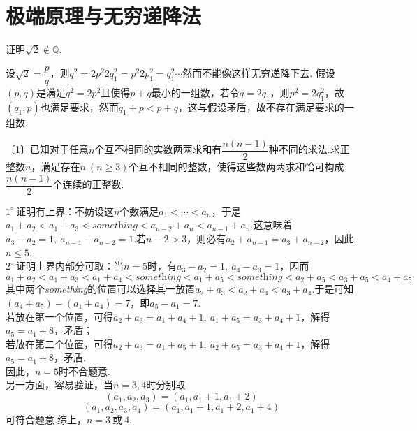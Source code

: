 \documentclass[cn,hazy,black,10pt,normal]{elegantnote}
\newenvironment{guess}{
  \color{guess}}{\newline \color{black}}
\newcommand{\nd}[1]{〔#1〕}
\newcommand{\buzhou}[1]{$#1^{\circ} \ $}
\begin{document}
\section{极端原理与无穷递降法}

\begin{instance}
	证明$\sqrt{2} \notin \mathbb{Q}$.
\end{instance}
\begin{solution}
	\begin{guess}
		设$\sqrt{2}=\dfrac{p}{q}$，则$q^2=2p^2$$2q_1^2=p^2$$2p_1^2=q_1^2 \cdots$然而不能像这样无穷递降下去.
	\end{guess}
	假设$(p,q)$是满足$q^2=2p^2$且使得$p+q$最小的一组数，若令$q=2q_1$，则$p^2=2q_1^2$，故$(q_1,p)$也满足要求，然而$q_1+p<p+q$，这与假设矛盾，故不存在满足要求的一组数.
\end{solution}

\begin{problem} %
	\nd{1}已知对于任意$n$个互不相同的实数两两求和有$\dfrac{n(n-1)}{2}$种不同的求法.求正整数$n$，满足存在$n~(n \geq 3)$个互不相同的整数，使得这些数两两求和恰可构成$\dfrac{n(n-1)}{2}$个连续的正整数.
\end{problem}
\begin{solution}
	\buzhou{1}证明有上界：不妨设这$n$个数满足$a_1< \cdots <a_n$，于是$a_1+a_2<a_1+a_3< \textit{something} <a_{n-2}+a_n<a_{n-1}+a_n$.这意味着$a_3-a_2=1,~a_{n-1}-a_{n-2}=1$.若$n-2>3$，则必有$a_2+a_{n-1} = a_3+a_{n-2}$，因此$n \leq 5$. \\
	\buzhou{2}证明上界内部分可取：当$n=5$时，有$a_3-a_2=1,~a_4-a_3=1$，因而$$a_1+a_2 < a_1+a_3 < a_1+a_4 < \textit{something} < a_1+a_5 < \textit{something} <a_2+a_5 < a_3+a_5 < a_4+a_5$$
	其中两个\textit{something}的位置可以选择其一放置$a_2+a_3 < a_2+a_4 < a_3+a_4$.于是可知$(a_4+a_5) - (a_1+a_4)=7$，即$a_5-a_1=7$. \\
	若放在第一个位置，可得$a_2+a_3=a_1+a_4+1,~a_1+a_5=a_3+a_4+1$，解得$a_5=a_1+8$，矛盾； \\
	若放在第二个位置，可得$a_2+a_3=a_1+a_5+1,~a_2+a_5=a_3+a_4+1$，解得$a_5=a_1+8$，矛盾. \\
	因此，$n=5$时不合题意. \\
	另一方面，容易验证，当$n=3,4$时分别取
	$$(a_1,a_2,a_3) = (a_1,a_1+1,a_1+2)$$
	$$(a_1,a_2,a_3,a_4) = (a_1,a_1+1,a_1+2,a_1+4)$$
	可符合题意.综上，$n=3~ \textit{或} ~4$.
\end{solution}
\end{document}
